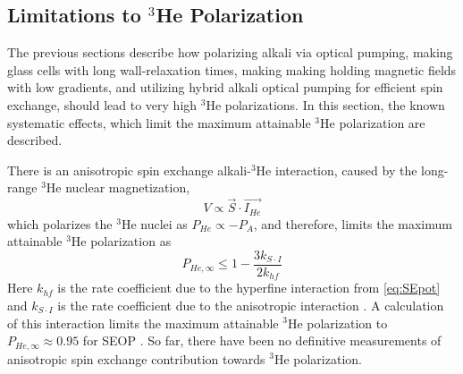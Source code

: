\subsection{Limitations to $^{3}$He Polarization}

The previous sections describe how polarizing alkali via optical pumping, making glass cells with long wall-relaxation times, making making holding magnetic fields with low gradients, and utilizing hybrid alkali optical pumping for efficient spin exchange, should lead to very high $^3$He polarizations. In this section, the known systematic effects, which limit the maximum attainable $^3$He polarization are described.  

There is an anisotropic spin exchange alkali-$^3$He interaction, caused by the long-range $^3$He nuclear magnetization,
\begin{equation}
    V \propto  \Vec{S} \cdot \Vec{I_{He}}
\end{equation}
which polarizes the $^3$He nuclei as $ P_{He} \propto - P_A $, and therefore, limits the maximum attainable $^3$He polarization as
\begin{equation}
    P_{He, \infty} \le 1 - \frac{3 k_{S\cdot I}}{ 2 k_{hf}}
\end{equation}
Here $k_{hf}$ is the rate coefficient due to the hyperfine interaction from \cref{eq:SEpot} and $k_{S\cdot I}$ is the rate coefficient due to the anisotropic interaction \cite{Walter1998}. A calculation of this interaction limits the maximum attainable $^3$He polarization to $P_{He, \infty} \approx 0.95$ for SEOP \cite{Walter1998, Tscherbul2011}. So far, there have been no definitive measurements of anisotropic spin exchange contribution towards $^3$He polarization.

